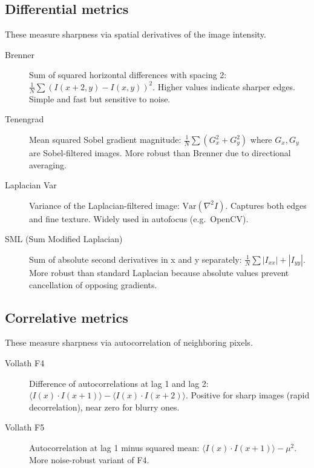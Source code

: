 \documentclass[11pt]{article}
\begin{document}
\subsection*{Differential metrics}
These measure sharpness via spatial derivatives of the image intensity.
\begin{description}
\item[Brenner] Sum of squared horizontal differences with spacing 2: $\frac{1}{N}\sum (I(x+2,y) - I(x,y))^2$. Higher values indicate sharper edges. Simple and fast but sensitive to noise.
\item[Tenengrad] Mean squared Sobel gradient magnitude: $\frac{1}{N}\sum (G_x^2 + G_y^2)$ where $G_x, G_y$ are Sobel-filtered images. More robust than Brenner due to directional averaging.
\item[Laplacian Var] Variance of the Laplacian-filtered image: $\mathrm{Var}(\nabla^2 I)$. Captures both edges and fine texture. Widely used in autofocus (e.g.\ OpenCV).
\item[SML (Sum Modified Laplacian)] Sum of absolute second derivatives in x and y separately: $\frac{1}{N}\sum |I_{xx}| + |I_{yy}|$. More robust than standard Laplacian because absolute values prevent cancellation of opposing gradients.
\end{description}

\subsection*{Correlative metrics}
These measure sharpness via autocorrelation of neighboring pixels.
\begin{description}
\item[Vollath F4] Difference of autocorrelations at lag 1 and lag 2: $\langle I(x) \cdot I(x+1) \rangle - \langle I(x) \cdot I(x+2) \rangle$. Positive for sharp images (rapid decorrelation), near zero for blurry ones.
\item[Vollath F5] Autocorrelation at lag 1 minus squared mean: $\langle I(x) \cdot I(x+1) \rangle - \mu^2$. More noise-robust variant of F4.
\end{description}
\end{document}
